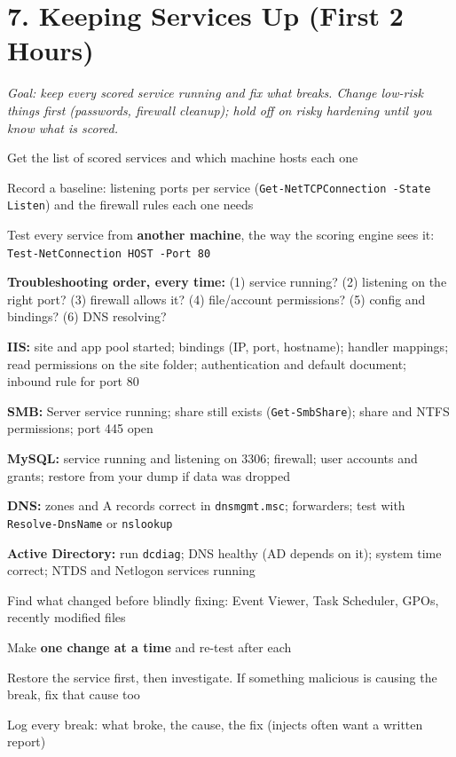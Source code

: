 \documentclass[11pt]{article}
\newcommand{\cmd}[1]{\texttt{\small #1}}
\begin{document}
\section*{7. Keeping Services Up (First 2 Hours)}
\textit{Goal: keep every scored service running and fix what breaks. Change low-risk things first (passwords, firewall cleanup); hold off on risky hardening until you know what is scored.}
\begin{mycheck}
  \item Get the list of scored services and which machine hosts each one
  \item Record a baseline: listening ports per service (\cmd{Get-NetTCPConnection -State Listen}) and the firewall rules each one needs
  \item Test every service from \textbf{another machine}, the way the scoring engine sees it: \cmd{Test-NetConnection HOST -Port 80}
  \item \textbf{Troubleshooting order, every time:} (1) service running? (2) listening on the right port? (3) firewall allows it? (4) file/account permissions? (5) config and bindings? (6) DNS resolving?
  \item \textbf{IIS:} site and app pool started; bindings (IP, port, hostname); handler mappings; read permissions on the site folder; authentication and default document; inbound rule for port 80
  \item \textbf{SMB:} Server service running; share still exists (\cmd{Get-SmbShare}); share and NTFS permissions; port 445 open
  \item \textbf{MySQL:} service running and listening on 3306; firewall; user accounts and grants; restore from your dump if data was dropped
  \item \textbf{DNS:} zones and A records correct in \cmd{dnsmgmt.msc}; forwarders; test with \cmd{Resolve-DnsName} or \cmd{nslookup}
  \item \textbf{Active Directory:} run \cmd{dcdiag}; DNS healthy (AD depends on it); system time correct; NTDS and Netlogon services running
  \item Find what changed before blindly fixing: Event Viewer, Task Scheduler, GPOs, recently modified files
  \item Make \textbf{one change at a time} and re-test after each
  \item Restore the service first, then investigate. If something malicious is causing the break, fix that cause too
  \item Log every break: what broke, the cause, the fix (injects often want a written report)
\end{mycheck}
\end{document}

